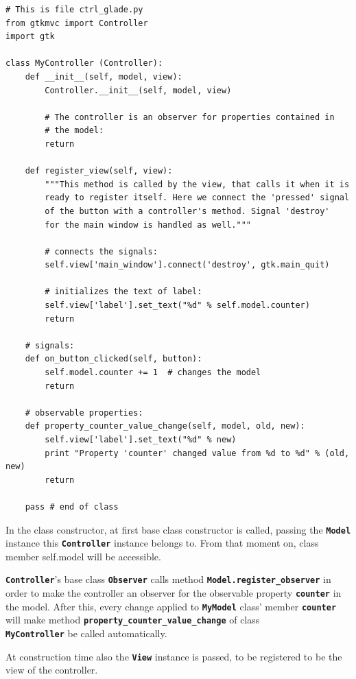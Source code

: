 \documentclass{article}
\newcommand{\codename}[1]{\texttt{\bfseries \textcolor {codecolor}{#1}}\xspace}
\newcommand{\codesize}{\small } %
\begin{document}
{ \codesize 
\begin{verbatim}   
# This is file ctrl_glade.py
from gtkmvc import Controller
import gtk

class MyController (Controller):
    def __init__(self, model, view):
        Controller.__init__(self, model, view)

        # The controller is an observer for properties contained in
        # the model:
        return

    def register_view(self, view):
        """This method is called by the view, that calls it when it is
        ready to register itself. Here we connect the 'pressed' signal
        of the button with a controller's method. Signal 'destroy'
        for the main window is handled as well."""

        # connects the signals:
        self.view['main_window'].connect('destroy', gtk.main_quit)
        
        # initializes the text of label:
        self.view['label'].set_text("%d" % self.model.counter)
        return
       
    # signals:
    def on_button_clicked(self, button):
        self.model.counter += 1  # changes the model
        return

    # observable properties:
    def property_counter_value_change(self, model, old, new):
        self.view['label'].set_text("%d" % new)
        print "Property 'counter' changed value from %d to %d" % (old, new)
        return
    
    pass # end of class
\end{verbatim}
} 

In the class constructor, at first base class constructor is called,
passing the \codename{Model} instance this \codename{Controller}
instance belongs to. From that moment on, class member self.model will
be accessible. 

\codename{Controller}'s base class \codename{Observer} calls method
\codename{Model.register\_observer} in order to make the controller
an observer for the observable property \codename{counter} in the
model. After this, every change applied to \codename{MyModel} class'
member \codename{counter} will make method
\codename{property\_counter\_value\_change} of class \\
\codename{MyController} be called automatically.

At construction time also the \codename{View} instance is passed,
to be registered to be the view of the controller.
\end{document}

